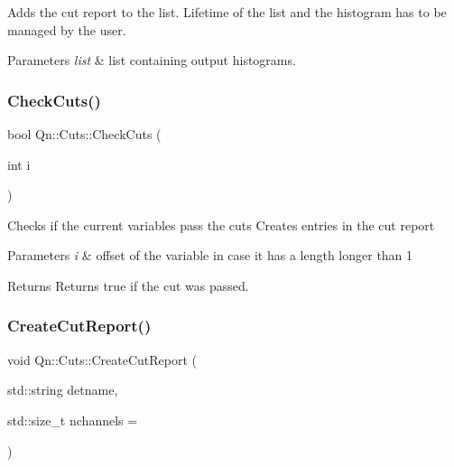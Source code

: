 Adds the cut report to the list. Lifetime of the list and the histogram has to be managed by the user. 


\begin{DoxyParams}{Parameters}
{\em list} & list containing output histograms. \\
\hline
\end{DoxyParams}
\mbox{\label{classQn_1_1Cuts_a9b010978523b569af5c1a40a6a03d898}} 
\subsubsection{\texorpdfstring{Check\+Cuts()}{CheckCuts()}}
{\footnotesize\ttfamily bool Qn\+::\+Cuts\+::\+Check\+Cuts (\begin{DoxyParamCaption}\item[{int}]{i }\end{DoxyParamCaption})\hspace{0.3cm}{\ttfamily [inline]}}

Checks if the current variables pass the cuts Creates entries in the cut report 
\begin{DoxyParams}{Parameters}
{\em i} & offset of the variable in case it has a length longer than 1 \\
\hline
\end{DoxyParams}
\begin{DoxyReturn}{Returns}
Returns true if the cut was passed. 
\end{DoxyReturn}
\mbox{\label{classQn_1_1Cuts_a4d53915785801bca58a9290149dca028}} 
\subsubsection{\texorpdfstring{Create\+Cut\+Report()}{CreateCutReport()}}
{\footnotesize\ttfamily void Qn\+::\+Cuts\+::\+Create\+Cut\+Report (\begin{DoxyParamCaption}\item[{std\+::string}]{detname,  }\item[{std\+::size\+\_\+t}]{nchannels = {} }\end{DoxyParamCaption})\hspace{0.3cm}{\ttfamily [inline]}}



